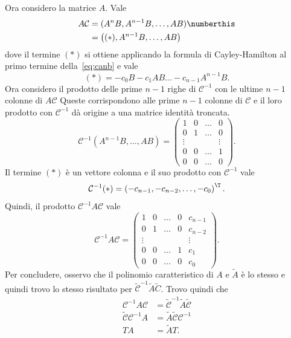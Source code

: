\begin{steps}
    Ora considero la matrice $A$.
    Vale
    \begin{align*}
        A\mathcal C &= (A^n B, A^{n-1} B, \ldots, AB) \numberthis\label{eq:canb} \\
        &= \left((*), A^{n-1} B, \ldots, AB \right)
    \end{align*}
    dove il termine $(*)$ si ottiene applicando la formula di Cayley-Hamilton
    al primo termine della~\eqref{eq:canb} e vale
    \begin{equation*}
     (*) = -c_0 B - c_{1} AB \ldots - c_{n-1}A^{n-1} B.
    \end{equation*}
    Ora considero il prodotto delle prime $n-1$ righe di  $\mathcal C^{-1}$
    con le ultime $n-1$ colonne di $A\mathcal C$
    Queste corrispondono alle prime $n-1$ colonne di $\mathcal C$ e il loro prodotto
    con $\mathcal C^{-1}$ dà origine a una matrice identità troncata.
    \begin{equation*}
        \mathcal C^{-1} (A^{n-1} B, \ldots, AB) = \left(
        \begin{array}{cccc}
            1 & 0 & \ldots & 0  \\
            0 & 1 & \ldots & 0 \\
            \vdots & & &   \vdots\\
            0 & 0 & \ldots & 1 \\
            0 & 0 & \ldots & 0
        \end{array}
        \right).
    \end{equation*}
    Il termine $(*)$ è un vettore colonna e il suo prodotto con $\mathcal C^{-1}$ vale
    \begin{equation*}
        \mathcal C^{-1}(*) = \left(
             -c_{n-1},
            -c_{n-2},
            \ldots,     -c_0
        \right)^\T.
    \end{equation*}
    Quindi, il prodotto $\mathcal C^{-1}A\mathcal C$ vale
    \begin{equation*}
        \mathcal C^{-1} A \mathcal C = \left(
        \begin{array}{ccccc}
            1 & 0 & \ldots & 0 & c_{n-1} \\
            0 & 1 & \ldots & 0 & c_{n-2}\\
            \vdots & & & &  \vdots\\
            0 & 0 & \ldots & 1 & c_{1}\\
            0 & 0 & \ldots & 0 & c_0
        \end{array}
        \right).
    \end{equation*}
    Per concludere, osservo che il polinomio caratteristico di $A$ e $\tilde A$ è
    lo stesso e quindi trovo lo stesso risultato per $\tilde {\mathcal C}^{-1} \tilde A \tilde C$.
    Trovo quindi che
    \begin{align*}
        \mathcal C^{-1} A\mathcal C &= \tilde {\mathcal C}^{-1} \tilde A \tilde {\mathcal C} \\
        \tilde {\mathcal C}  {\mathcal C}^{-1}A &= \tilde A \tilde {\mathcal C} {\mathcal C}^{-1} \\
        T A &= \tilde A T.
    \end{align*}



\end{steps}
